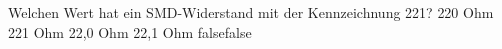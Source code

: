     {Welchen Wert hat ein SMD-Widerstand mit der Kennzeichnung 221?}
    {220 Ohm}
    {221 Ohm}
    {22,0 Ohm}
    {22,1 Ohm}
    {false}{false}